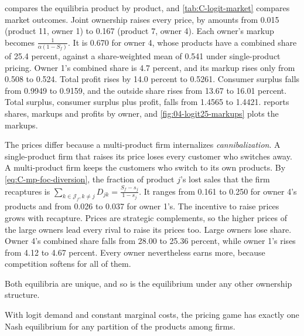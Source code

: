  compares the equilibria product by product, and \cref{tab:C-logit-market} compares market
outcomes. Joint ownership raises every price, by amounts from 0.015 (product 11, owner 1) to 0.167 (product 7,
owner 4). Each owner's markup becomes $\frac{1}{\alpha(1 - S_f)}$. It is 0.670 for owner 4, whose products have a
combined share of 25.4 percent, against a share-weighted mean of 0.541 under single-product pricing. Owner 1's
combined share is 4.7 percent, and its markup rises only from 0.508 to 0.524. Total profit rises by 14.0 percent to
0.5261. Consumer surplus falls from 0.9949 to 0.9159, and the outside share rises from 13.67 to 16.01 percent.
Total surplus, consumer surplus plus profit, falls from 1.4565 to 1.4421.  reports shares,
markups and profits by owner, and \cref{fig:04-logit25-markups} plots the markups.

The prices differ because a multi-product firm internalizes \emph{cannibalization}. A single-product firm that raises
its price loses every customer who switches away. A multi-product firm keeps the customers who switch to its own
products. By \eqref{eq:C-mp-foc-diversion}, the fraction of product $j$'s lost sales that the firm recaptures is
$\sum_{k \in \mathcal{J}_f, k \ne j}D_{jk} = \frac{S_f - s_j}{1 - s_j}$. It ranges from 0.161 to 0.250 for owner 4's
products and from 0.026 to 0.037 for owner 1's. The incentive to raise prices grows with recapture. Prices are
strategic complements, so the higher prices of the large owners lead every rival to raise its prices too. Large
owners lose share. Owner 4's combined share falls from 28.00 to 25.36 percent, while owner 1's rises from 4.12 to
4.67 percent. Every owner nevertheless earns more, because competition softens for all of them.

Both equilibria are unique, and so is the equilibrium under any other ownership structure.

\begin{proposition}[Uniqueness]\label{prop:C-unique}
With logit demand and constant marginal costs, the pricing game has exactly one Nash equilibrium for any
partition of the products among firms.
\end{proposition}

